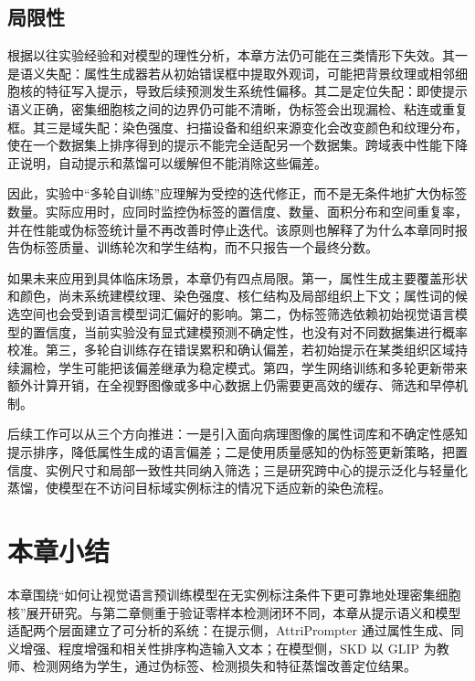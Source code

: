 \subsection{局限性}

根据以往实验经验和对模型的理性分析，本章方法仍可能在三类情形下失效。其一是语义失配：属性生成器若从初始错误框中提取外观词，可能把背景纹理或相邻细胞核的特征写入提示，导致后续预测发生系统性偏移。其二是定位失配：即使提示语义正确，密集细胞核之间的边界仍可能不清晰，伪标签会出现漏检、粘连或重复框。其三是域失配：染色强度、扫描设备和组织来源变化会改变颜色和纹理分布，使在一个数据集上排序得到的提示不能完全适配另一个数据集。跨域表中性能下降正说明，自动提示和蒸馏可以缓解但不能消除这些偏差。

因此，实验中“多轮自训练”应理解为受控的迭代修正，而不是无条件地扩大伪标签数量。实际应用时，应同时监控伪标签的置信度、数量、面积分布和空间重复率，并在性能或伪标签统计量不再改善时停止迭代。该原则也解释了为什么本章同时报告伪标签质量、训练轮次和学生结构，而不只报告一个最终分数。

如果未来应用到具体临床场景，本章仍有四点局限。第一，属性生成主要覆盖形状和颜色，尚未系统建模纹理、染色强度、核仁结构及局部组织上下文；属性词的候选空间也会受到语言模型词汇偏好的影响。第二，伪标签筛选依赖初始视觉语言模型的置信度，当前实验没有显式建模预测不确定性，也没有对不同数据集进行概率校准。第三，多轮自训练存在错误累积和确认偏差，若初始提示在某类组织区域持续漏检，学生可能把该偏差继承为稳定模式。第四，学生网络训练和多轮更新带来额外计算开销，在全视野图像或多中心数据上仍需要更高效的缓存、筛选和早停机制。

后续工作可以从三个方向推进：一是引入面向病理图像的属性词库和不确定性感知提示排序，降低属性生成的语言偏差；二是使用质量感知的伪标签更新策略，把置信度、实例尺寸和局部一致性共同纳入筛选；三是研究跨中心的提示泛化与轻量化蒸馏，使模型在不访问目标域实例标注的情况下适应新的染色流程。

\section{本章小结}

本章围绕“如何让视觉语言预训练模型在无实例标注条件下更可靠地处理密集细胞核”展开研究。与第二章侧重于验证零样本检测闭环不同，本章从提示语义和模型适配两个层面建立了可分析的系统：在提示侧，AttriPrompter 通过属性生成、同义增强、程度增强和相关性排序构造输入文本；在模型侧，SKD 以 GLIP 为教师、检测网络为学生，通过伪标签、检测损失和特征蒸馏改善定位结果。

